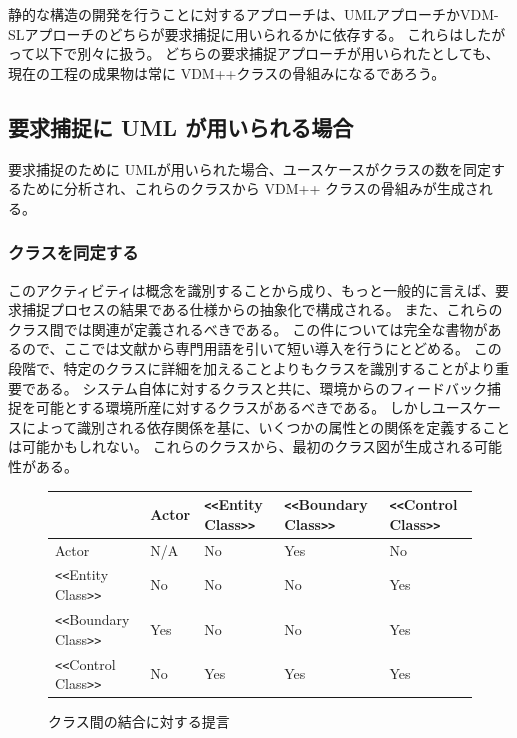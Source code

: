 \documentclass[\pformat,12pt]{jreport}
\begin{document}
静的な構造の開発を行うことに対するアプローチは、UMLアプローチかVDM-SLアプローチのどちらが要求捕捉に用いられるかに依存する。
これらはしたがって以下で別々に扱う。
どちらの要求捕捉アプローチが用いられたとしても、現在の工程の成果物は常に VDM++クラスの骨組みになるであろう。

\subsection{要求捕捉に UML が用いられる場合}\label{subsec:UMLreq}

要求捕捉のために UMLが用いられた場合、ユースケースがクラスの数を同定するために分析され、これらのクラスから VDM++ クラスの骨組みが生成される。

\subsubsection{クラスを同定する}

このアクティビティは概念を識別することから成り、もっと一般的に言えば、要求捕捉プロセスの結果である仕様からの抽象化で構成される。
また、これらのクラス間では関連が定義されるべきである。
この件については完全な書物があるので、ここでは文献\cite{Kruchten00}から専門用語を引いて短い導入を行うにとどめる。
この段階で、特定のクラスに詳細を加えることよりもクラスを識別することがより重要である。
システム自体に対するクラスと共に、環境からのフィードバック捕捉を可能とする環境所産に対するクラスがあるべきである。
しかしユースケースによって識別される依存関係を基に、いくつかの属性との関係を定義することは可能かもしれない。
これらのクラスから、最初のクラス図が生成される可能性がある。

\begin{figure}
\begin{center}
\begin{tabular}{|l|l|l|l|l|}\hline
         & Actor & {\tt <<}Entity Class{\tt >>} & {\tt <<}Boundary Class{\tt >>} &
           {\tt <<}Control Class{\tt >>} \\ \hline
Actor                        &   N/A  & No & Yes & No \\ \hline
{\tt <<}Entity Class{\tt >>} &  No    &No\footnotemark & No & Yes \\ \hline
{\tt <<}Boundary Class{\tt >>}& Yes   & No & No  & Yes \\ \hline
{\tt <<}Control Class{\tt >>} & No    &Yes & Yes & Yes \\ \hline
\end{tabular}
\end{center}
\caption{クラス間の結合に対する提言\label{tab:assoc}}
\end{figure}
\end{document}

